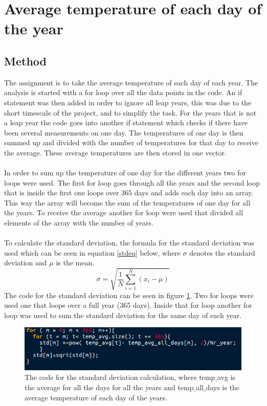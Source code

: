 \documentclass[../main.tex]{subfiles}
\begin{document}
\section{Average temperature of each day of the year}
\subsection{Method}
The assignment is to take the average temperature of each day of each year. The analysis is started with a for loop over all the data points in the code. An if statement was then added in order to ignore all leap years, this was due to the short timescale of the project, and to simplify the task. For the years that is not a leap year the code goes into another if statement which checks if there have been several measurements on one day. The temperatures of one day is then summed up and divided with the number of temperatures for that day to receive the average. These average temperatures are then stored in one vector.
\\\\
In order to sum up the temperature of one day for the different years two for loops were used. The first for loop goes through all the years and the second loop that is inside the first one loops over 365 days and adds each day into an array. This way the array will become the sum of the temperatures of one day for all the years. To receive the average another for loop were used that divided all elements of the array with the number of years.
\\\\
To calculate the standard deviation, the formula for the standard deviation was used which can be seen in equation \ref{stdeq} below, where $\sigma$ denotes the standard deviation and $\mu$ is the mean.
\begin{equation}
\label{stdeq}
\sigma = \sqrt{\frac{1}{N} \sum ^N_{i=1} (x_i - \mu) }
\end{equation}
The code for the standard deviation can be seen in figure \ref{stdcode}. Two for loops were used one that loops over a full year (365 days). Inside that for loop another for loop was used to sum the standard deviation for the same day of each year.
\begin{figure}[H]
\includegraphics[scale= 0.5]{std_MNXB01.png}
\caption{The code for the standard deviation calculation, where temp$\_$avg is the average for all the days for all the years and temp$\_$all$\_$days is the average temperature of each day of the years. }
\label{stdcode}
\end{figure}
\end{document}
